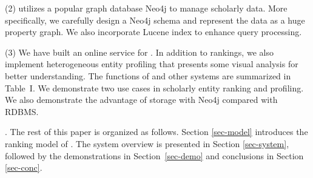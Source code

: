 
\noindent (2) \oursystem utilizes a popular graph database Neo4j to manage scholarly data. More specifically, we carefully design a Neo4j schema and represent the data as a huge property graph. We also incorporate Lucene index to enhance query processing.


\noindent (3) We have built an online service for \oursystem. In addition to rankings, we also implement heterogeneous entity profiling that presents some visual analysis for better understanding. The functions of \oursystem and other systems are summarized in Table~I. We demonstrate two use cases in scholarly entity ranking and profiling. We also demonstrate the advantage of storage with Neo4j compared with RDBMS.



.
The rest of this paper is organized as follows. Section \ref{sec-model} introduces the ranking model of \oursystem. The system overview is presented in Section \ref{sec-system}, followed by the demonstrations in Section~\ref{sec-demo} and conclusions in Section \ref{sec-conc}.
